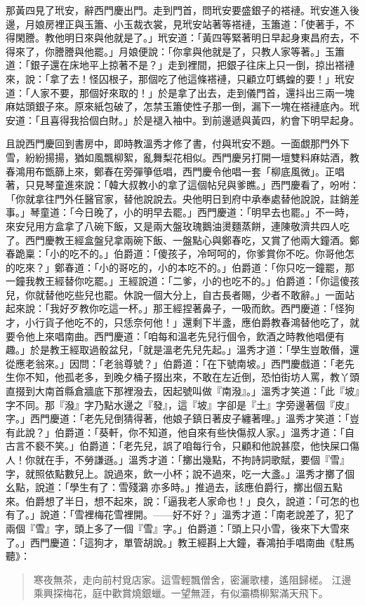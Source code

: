 那黃四見了玳安，辭西門慶出門。走到門首，問玳安要盛銀子的褡褳。玳安進入後邊，月娘房裡正與玉簫、小玉裁衣裳，見玳安站著等褡褳，玉簫道：「使著手，不得閑謄。教他明日來與他就是了。」玳安道：「黃四等緊著明日早起身東昌府去，不得來了，你謄謄與他罷。」月娘便說：「你拿與他就是了，只教人家等著。」玉簫道：「銀子還在床地平上掠著不是？」走到裡間，把銀子往床上只一倒，掠出褡褳來，說：「拿了去！怪囚根子，那個吃了他這條褡褳，只顧立叮螞蝗的要！」玳安道：「人家不要，那個好來取的！」於是拿了出去，走到儀門首，還抖出三兩一塊麻姑頭銀子來。原來紙包破了，怎禁玉簫使性子那一倒，漏下一塊在褡褳底內。玳安道：「且喜得我拾個白財。」於是褪入袖中。到前邊遞與黃四，約會下明早起身。

且說西門慶回到書房中，即時教溫秀才修了書，付與玳安不題。一面覷那門外下雪，紛紛揚揚，猶如風飄柳絮，亂舞梨花相似。西門慶另打開一壇雙料麻姑酒，教春鴻用布甑篩上來，鄭春在旁彈箏低唱，西門慶令他唱一套「柳底風微」。正唱著，只見琴童進來說：「韓大叔教小的拿了這個帖兒與爹瞧。」西門慶看了，吩咐：「你就拿往門外任醫官家，替他說說去。央他明日到府中承奉處替他說說，註銷差事。」琴童道：「今日晚了，小的明早去罷。」西門慶道：「明早去也罷。」不一時，來安兒用方盒拿了八碗下飯，又是兩大盤玫瑰鵝油燙麵蒸餅，連陳敬濟共四人吃了。西門慶教王經盒盤兒拿兩碗下飯、一盤點心與鄭春吃，又賞了他兩大鐘酒。鄭春跪稟：「小的吃不的。」伯爵道：「傻孩子，冷呵呵的，你爹賞你不吃。你哥他怎的吃來？」鄭春道：「小的哥吃的，小的本吃不的。」伯爵道：「你只吃一鐘罷，那一鐘我教王經替你吃罷。」王經說道：「二爹，小的也吃不的。」伯爵道：「你這傻孩兒，你就替他吃些兒也罷。休說一個大分上，自古長者賜，少者不敢辭。」一面站起來說：「我好歹教你吃這一杯。」那王經捏著鼻子，一吸而飲。西門慶道：「怪狗才，小行貨子他吃不的，只恁奈何他！」還剩下半盞，應伯爵教春鴻替他吃了，就要令他上來唱南曲。西門慶道：「咱每和溫老先兒行個令，飲酒之時教他唱便有趣。」於是教王經取過骰盆兒，「就是溫老先兒先起。」溫秀才道：「學生豈敢僭，還從應老翁來。」因問：「老翁尊號？」伯爵道：「在下號南坡。」西門慶戲道：「老先生你不知，他孤老多，到晚夕桶子掇出來，不敢在左近倒，恐怕街坊人罵，教丫頭直掇到大南首縣倉牆底下那裡潑去，因起號叫做『南潑』。」溫秀才笑道：「此『坡』字不同。那『潑』字乃點水邊之『發』，這『坡』字卻是『土』字旁邊著個『皮』字。」西門慶道：「老先兒倒猜得著，他娘子鎮日著皮子纏著哩。」溫秀才笑道：「豈有此說？」伯爵道：「葵軒，你不知道，他自來有些快傷叔人家。」溫秀才道：「自古言不褻不笑。」伯爵道：「老先兒，誤了咱每行令，只顧和他說甚麼，他快屎口傷人！你就在手，不勞謙遜。」溫秀才道：「擲出幾點，不拘詩詞歌賦，要個『雪』字，就照依點數兒上。說過來，飲一小杯；說不過來，吃一大盞。」溫秀才擲了個幺點，說道：「學生有了：雪殘鸂𪄠亦多時。」推過去，該應伯爵行，擲出個五點來。伯爵想了半日，想不起來，說：「逼我老人家命也！」良久，說道：「可怎的也有了。」說道：「雪裡梅花雪裡開。——好不好？」溫秀才道：「南老說差了，犯了兩個『雪』字，頭上多了一個『雪』字。」伯爵道：「頭上只小雪，後來下大雪來了。」西門慶道：「這狗才，單管胡說。」教王經斟上大鐘，春鴻拍手唱南曲《駐馬聽》：
\begin{quote}
寒夜無茶，走向前村覓店家。這雪輕飄僧舍，密灑歌樓，遙阻歸槎。
江邊乘興探梅花，庭中歡賞燒銀蠟。一望無涯，有似灞橋柳絮滿天飛下。
\end{quote}

